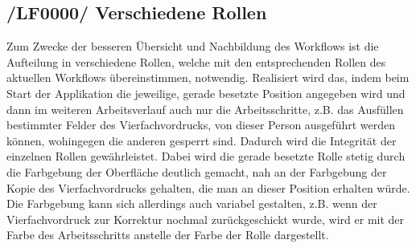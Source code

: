 \subsection{/LF0000/ Verschiedene Rollen}
Zum Zwecke der besseren Übersicht und Nachbildung des Workflows ist die Aufteilung in verschiedene Rollen, welche mit den entsprechenden Rollen des aktuellen Workflows übereinstimmen, notwendig. Realisiert wird das, indem beim Start der Applikation die jeweilige, gerade besetzte Position angegeben wird und dann im weiteren Arbeitsverlauf auch nur die Arbeitsschritte, z.B. das Ausfüllen bestimmter Felder des Vierfachvordrucks, von dieser Person ausgeführt werden können, wohingegen die anderen gesperrt sind. Dadurch wird die Integrität der einzelnen Rollen gewährleistet. Dabei wird die gerade besetzte Rolle stetig durch die Farbgebung der Oberfläche deutlich gemacht, nah an der Farbgebung der Kopie des Vierfachvordrucks gehalten, die man an dieser Position erhalten würde. Die Farbgebung kann sich allerdings auch variabel gestalten, z.B. wenn der Vierfachvordruck zur Korrektur nochmal zurückgeschickt wurde, wird er mit der Farbe des Arbeitsschritts anstelle der Farbe der Rolle dargestellt. 

